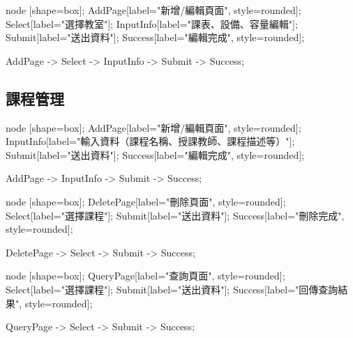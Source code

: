 \documentclass{article}
\begin{document}
\pagebreak


\begin{center}

	 {
		node [shape=box];
		AddPage[label="新增/編輯頁面", style=rounded];
		Select[label="選擇教室"];
		InputInfo[label="課表、設備、容量編輯"];
		Submit[label="送出資料"];
		Success[label="編輯完成", style=rounded];

		AddPage -> Select -> InputInfo -> Submit -> Success;
	}
\end{center}

\pagebreak

\subsection{課程管理}

\begin{center}

	 {
		node [shape=box];
		AddPage[label="新增/編輯頁面", style=rounded];
		InputInfo[label="輸入資料（課程名稱、授課教師、課程描述等）"];
		Submit[label="送出資料"];
		Success[label="編輯完成", style=rounded];

		AddPage -> InputInfo -> Submit -> Success;
	}
\end{center}

\begin{center}

	 {
		node [shape=box];
		DeletePage[label="刪除頁面", style=rounded];
		Select[label="選擇課程"];
		Submit[label="送出資料"];
		Success[label="刪除完成", style=rounded];

		DeletePage -> Select -> Submit -> Success;
	}
\end{center}

\pagebreak

\begin{center}

	 {
		node [shape=box];
		QueryPage[label="查詢頁面", style=rounded];
		Select[label="選擇課程"];
		Submit[label="送出資料"];
		Success[label="回傳查詢結果", style=rounded];

		QueryPage -> Select -> Submit -> Success;
	}

\end{center}
\end{document}
